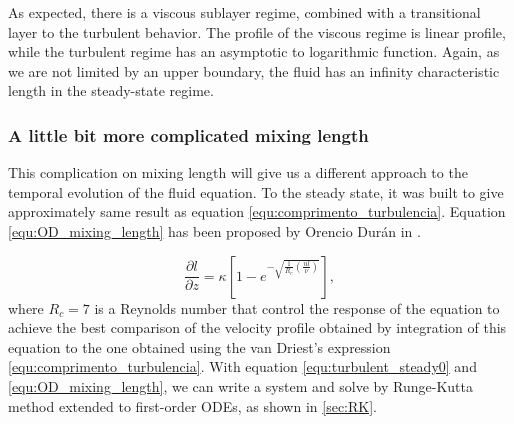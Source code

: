 \begin{apendicesenv}
    As expected, there is a viscous sublayer regime, combined with a transitional layer to the turbulent behavior. The profile of the viscous regime is linear profile, while the turbulent regime has an asymptotic to logarithmic function. Again, as we are not limited by an upper boundary, the fluid has an infinity characteristic length in the steady-state regime.

        \subsubsection{A little bit more complicated mixing length}
    This complication on mixing length will give us a different approach to the temporal evolution of the fluid equation. To the steady state, it was built to give approximately same result as equation \ref{equ:comprimento_turbulencia}. Equation \ref{equ:OD_mixing_length} has been proposed by Orencio Durán in \cite{Numerical_simulation_of_turbulent_sediment_transport}.

    \begin{equation}
        \frac{\partial l}{\partial z} = \kappa \left[1-e^{-\sqrt{\frac{1}{R_c}\left(\frac{ul}{\nu}\right)}}\right],
        \label{equ:OD_mixing_length}
    \end{equation}
where $R_c = 7$ is a Reynolds number that control the response of the equation to achieve the best comparison of the velocity profile obtained by integration of this equation to the one obtained using the van Driest's expression \ref{equ:comprimento_turbulencia}. With equation \ref{equ:turbulent_steady0} and \ref{equ:OD_mixing_length}, we can write a system and solve by Runge-Kutta method extended to first-order ODEs, as shown in \ref{sec:RK}.

\end{apendicesenv}
